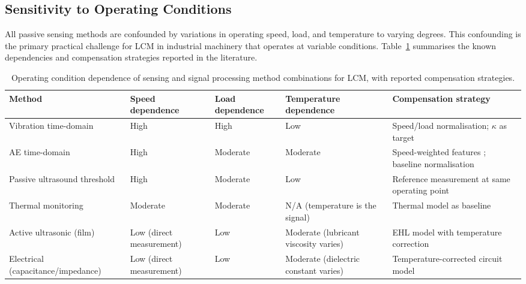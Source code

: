 \subsection{Sensitivity to Operating Conditions}
\label{subsec:comp_operating}

All passive sensing methods are confounded by variations in operating speed, load, and temperature to varying degrees. This confounding is the primary practical challenge for LCM in industrial machinery that operates at variable conditions. Table~\ref{tab:operating_sensitivity} summarises the known dependencies and compensation strategies reported in the literature.

\begin{table}[H]
\scriptsize
\centering
\renewcommand{\arraystretch}{1.4}
\setlength{\tabcolsep}{4pt}
\begin{tabularx}{\linewidth}{|
>{\raggedright\arraybackslash}p{2.5cm}
| >{\centering\arraybackslash}X
| >{\centering\arraybackslash}X
| >{\centering\arraybackslash}X
| >{\raggedright\arraybackslash}p{3cm} |}
\hline
\textbf{Method} & \textbf{Speed dependence} & \textbf{Load dependence} & \textbf{Temperature dependence} & \textbf{Compensation strategy} \\
\hline
Vibration time-domain & High & High & Low & Speed/load normalisation; $\kappa$ as target \cite{jakobsen_detecting_2023} \\
\hline
AE time-domain & High & Moderate & Moderate & Speed-weighted features \cite{hou_-situ_2025}; baseline normalisation \cite{cornel_condition_2021} \\
\hline
Passive ultrasound threshold & High & Moderate & Low & Reference measurement at same operating point \cite{lineham_ultrasonic_2008} \\
\hline
Thermal monitoring & Moderate & Moderate & N/A (temperature is the signal) & Thermal model as baseline \cite{moussa_passive_2017} \\
\hline
Active ultrasonic (film) & Low (direct measurement) & Low & Moderate (lubricant viscosity varies) & EHL model with temperature correction \cite{chen_evaluation_2023} \\
\hline
Electrical (capacitance/impedance) & Low (direct measurement) & Low & Moderate (dielectric constant varies) & Temperature-corrected circuit model \cite{cen_ehl_2021} \\
\hline
\end{tabularx}
\caption{Operating condition dependence of sensing and signal processing method combinations for LCM, with reported compensation strategies.}
\label{tab:operating_sensitivity}
\end{table}

